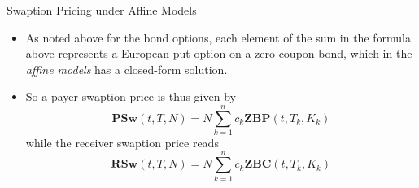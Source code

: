 \documentclass{beamer}
\begin{document}
\begin{frame}{Swaption Pricing under Affine Models}
\begin{itemize}
\item As noted above for the bond options, each element of the sum in the formula above represents a European put option on a zero-coupon bond, which in the \emph{affine models} has a closed-form solution.
\item So a payer swaption price is thus given by
	\begin{equation}
		\boxed{\textbf{PSw}(t,T,N) = N\sum_{k=1}^n c_k \textbf{ZBP}(t,T_k,K_k)}
	\end{equation}
	while the receiver swaption price reads
	\begin{equation}
		\boxed{\textbf{RSw}(t,T,N) = N\sum_{k=1}^n c_k \textbf{ZBC}(t,T_k,K_k)}
	\end{equation}
\end{itemize}	
\end{frame}
\end{document}
